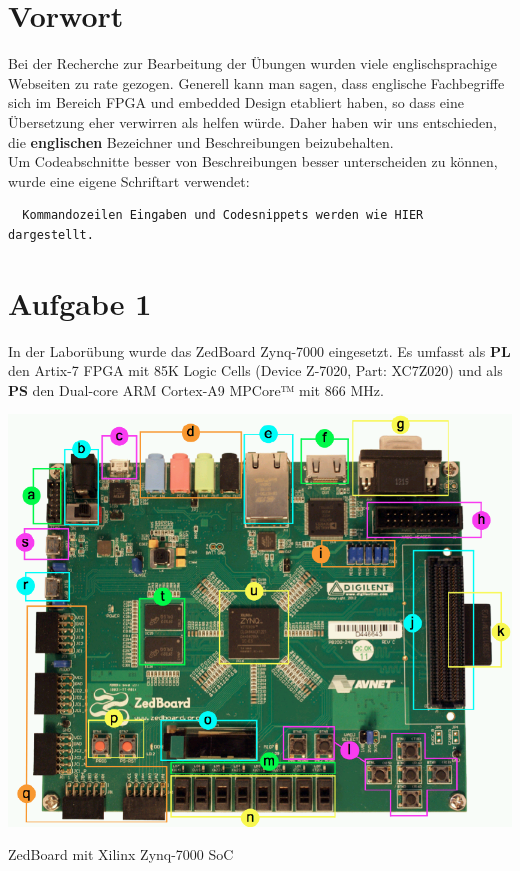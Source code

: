 \section{Vorwort}
Bei der Recherche zur Bearbeitung der Übungen wurden viele englischsprachige Webseiten zu rate gezogen. Generell kann man sagen, dass englische Fachbegriffe sich im Bereich FPGA und embedded Design etabliert haben, so dass eine Übersetzung eher verwirren als helfen würde. Daher haben wir uns entschieden, die \textbf{englischen} Bezeichner und Beschreibungen beizubehalten.\\
Um Codeabschnitte besser von Beschreibungen besser unterscheiden zu können, wurde eine eigene Schriftart verwendet:
\begin{verbatim}
  Kommandozeilen Eingaben und Codesnippets werden wie HIER dargestellt.
\end{verbatim}

\section{Aufgabe 1} \label{ex1}
In der Laborübung wurde das ZedBoard Zynq-7000 eingesetzt. Es umfasst als \textbf{PL} den Artix-7 FPGA mit 85K Logic Cells (Device Z-7020, Part: XC7Z020) und als \textbf{PS} den Dual-core ARM Cortex-A9 MPCore™ mit 866 MHz.\\

\begin{minipage}{\textwidth}
    \begin{center}        
        \includegraphics[scale=0.5]{img/a1.png} 
    \end{center}
\end{minipage}
\begin{center}
ZedBoard mit Xilinx Zynq-7000 SoC
\end{center}

